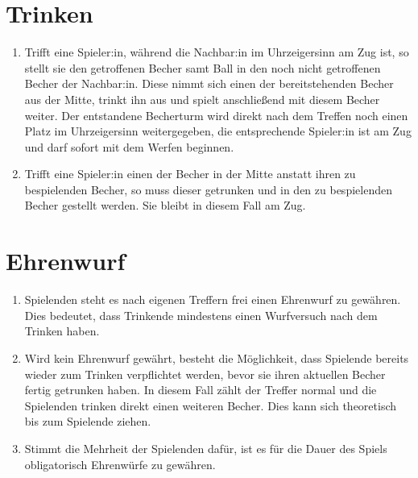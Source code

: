 \section{Trinken}
\begin{enumerate}[label={(\arabic*)}]
    \item
    Trifft eine Spieler:in, während die Nachbar:in im Uhrzeigersinn am Zug ist, so stellt sie den getroffenen Becher samt Ball in den noch nicht getroffenen Becher der Nachbar:in.
    Diese nimmt sich einen der bereitstehenden Becher aus der Mitte, trinkt ihn aus und spielt anschließend mit diesem Becher weiter.
    Der entstandene Becherturm wird direkt nach dem Treffen noch einen Platz im Uhrzeigersinn weitergegeben, die entsprechende Spieler:in ist am Zug und darf sofort mit dem Werfen beginnen.

    \item
    Trifft eine Spieler:in einen der Becher in der Mitte anstatt ihren zu bespielenden Becher, so muss dieser getrunken und in den zu bespielenden Becher gestellt werden.
    Sie bleibt in diesem Fall am Zug.
\end{enumerate}

\section{Ehrenwurf}
\begin{enumerate}[label={(\arabic*)}]
    \item
    Spielenden steht es nach eigenen Treffern frei einen \glqq{}Ehrenwurf\grqq{} zu gewähren.
    Dies bedeutet, dass Trinkende mindestens einen Wurfversuch nach dem Trinken haben.

    \item
    Wird kein Ehrenwurf gewährt, besteht die Möglichkeit, dass Spielende bereits wieder zum Trinken verpflichtet werden, bevor sie ihren aktuellen Becher fertig getrunken haben.
    In diesem Fall zählt der Treffer normal und die Spielenden trinken direkt einen weiteren Becher.
    Dies kann sich theoretisch bis zum Spielende ziehen.

    \item
    Stimmt die Mehrheit der Spielenden dafür, ist es für die Dauer des Spiels obligatorisch Ehrenwürfe zu gewähren.
\end{enumerate}
